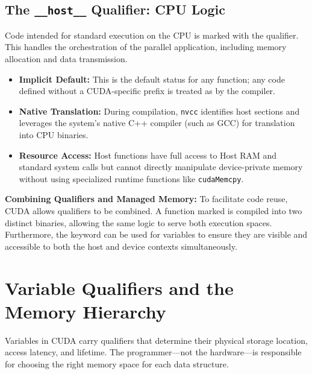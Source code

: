 \subsection{The \texttt{\_\_host\_\_} Qualifier: CPU Logic}

Code intended for standard execution on the CPU is marked with the  qualifier. This handles the orchestration of the parallel application, including memory allocation and data transmission.

\begin{itemize}
    \item \textbf{Implicit Default:} This is the default status for any function; any code defined without a CUDA-specific prefix is treated as  by the compiler.
    \item \textbf{Native Translation:} During compilation, \texttt{nvcc} identifies host sections and leverages the system’s native C++ compiler (such as GCC) for translation into CPU binaries.
    \item \textbf{Resource Access:} Host functions have full access to Host RAM and standard system calls but cannot directly manipulate device-private memory without using specialized runtime functions like \texttt{cudaMemcpy}.
\end{itemize}

\begin{ppnote}
\textbf{Combining Qualifiers and Managed Memory:} 
To facilitate code reuse, CUDA allows qualifiers to be combined. A function marked  is compiled into two distinct binaries, allowing the same logic to serve both execution spaces. Furthermore, the  keyword can be used for variables to ensure they are visible and accessible to both the host and device contexts simultaneously.
\end{ppnote}

\section{Variable Qualifiers and the Memory Hierarchy}
\label{sec:var-qualifiers}

Variables in CUDA carry qualifiers that determine their physical storage
location, access latency, and lifetime. The programmer---not the hardware---is
responsible for choosing the right memory space for each data structure.

